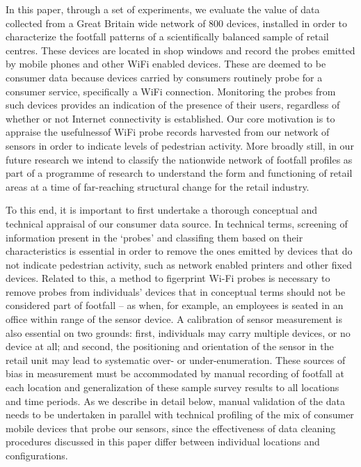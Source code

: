 In this paper, through a set of experiments, we evaluate the value of data collected from a Great Britain wide network of 800 devices, installed in order to characterize the footfall patterns of a scientifically balanced sample of retail centres.
These devices are located in shop windows and record the probes emitted by mobile phones and other WiFi enabled devices.
These are deemed to be consumer data because devices carried by consumers routinely probe for a consumer service, specifically a WiFi connection.
Monitoring the probes from such devices provides an indication of the presence of their users, regardless of whether or not Internet connectivity is established.
Our core motivation is to appraise the usefulnessof WiFi probe records harvested from our network of sensors in order to indicate levels of pedestrian activity.
More broadly still, in our future research we intend to classify the nationwide network of footfall profiles as part of a programme of research to understand the form and functioning of retail areas at a time of far-reaching structural change for the retail industry.

To this end, it is important to first undertake a thorough conceptual and technical appraisal of our consumer data source.
In technical terms, screening of information present in the `probes' and classifing them based on their characteristics is essential in order to remove the ones emitted by devices that do not indicate pedestrian activity, such as network enabled printers and other fixed devices.
Related to this, a method to figerprint Wi-Fi probes is necessary to remove probes from individuals’ devices that in conceptual terms should not be considered part of footfall – as when, for example, an employees is seated in an office within range of the sensor device.
A calibration of sensor measurement is also essential on two grounds: first, individuals may carry multiple devices, or no device at all; and second, the positioning and orientation of the sensor in the retail unit may lead to systematic over- or under-enumeration.
These sources of bias in measurement must be accommodated by manual recording of footfall at each location and generalization of these sample survey results to all locations and time periods.
As we describe in detail below, manual validation of the data needs to be undertaken in parallel with technical profiling of the mix of consumer mobile devices that probe our sensors, since the effectiveness of data cleaning procedures discussed in this paper differ between individual locations and configurations.
